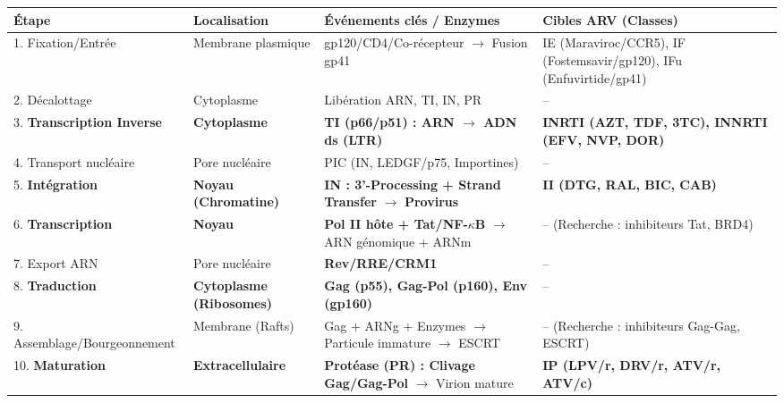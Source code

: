 \documentclass[11pt]{article}
\begin{document}
\begin{aretenir}
\begin{center}
\begin{tabularx}{\linewidth}{|l|X|X|X|}\hline
\textbf{Étape} & \textbf{Localisation} & \textbf{Événements clés / Enzymes} & \textbf{Cibles ARV (Classes)} \\ \hline
1. Fixation/Entrée & Membrane plasmique & gp120/CD4/Co-récepteur $\to$ Fusion gp41 & IE (Maraviroc/CCR5), IF (Fostemsavir/gp120), IFu (Enfuvirtide/gp41) \\ \hline
2. Décalottage & Cytoplasme & Libération ARN, TI, IN, PR & -- \\ \hline
3. \textbf{Transcription Inverse} & \textbf{Cytoplasme} & \textbf{TI (p66/p51) : ARN $\to$ ADN ds (LTR)} & \textbf{INRTI (AZT, TDF, 3TC), INNRTI (EFV, NVP, DOR)} \\ \hline
4. Transport nucléaire & Pore nucléaire & PIC (IN, LEDGF/p75, Importines) & -- \\ \hline
5. \textbf{Intégration} & \textbf{Noyau (Chromatine)} & \textbf{IN : 3'-Processing + Strand Transfer} $\to$ \textbf{Provirus} & \textbf{II (DTG, RAL, BIC, CAB)} \\ \hline
6. \textbf{Transcription} & \textbf{Noyau} & \textbf{Pol II hôte + Tat/NF-$\kappa$B} $\to$ ARN génomique + ARNm & -- (Recherche : inhibiteurs Tat, BRD4) \\ \hline
7. Export ARN & Pore nucléaire & \textbf{Rev/RRE/CRM1} & -- \\ \hline
8. \textbf{Traduction} & \textbf{Cytoplasme (Ribosomes)} & \textbf{Gag (p55), Gag-Pol (p160), Env (gp160)} & -- \\ \hline
9. Assemblage/Bourgeonnement & Membrane (Rafts) & Gag + ARNg + Enzymes $\to$ Particule immature $\to$ ESCRT & -- (Recherche : inhibiteurs Gag-Gag, ESCRT) \\ \hline
10. \textbf{Maturation} & \textbf{Extracellulaire} & \textbf{Protéase (PR) : Clivage Gag/Gag-Pol} $\to$ Virion mature & \textbf{IP (LPV/r, DRV/r, ATV/r, ATV/c)} \\ \hline
\end{tabularx}
\end{center}
\end{aretenir}
\end{document}
